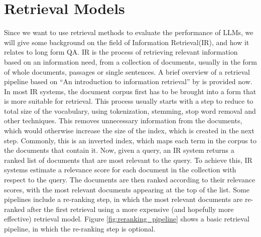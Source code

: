 \section{Retrieval Models}\label{sec:retrieval-models}
Since we want to use retrieval methods to evaluate the performance of LLMs, we will give some background on the field of Information Retrieval(IR), and how it relates to long form QA.
IR is the process of retrieving relevant information based on an information need, from a collection of documents, usually in the form of whole documents, passages or single sentences.
A brief overview of a retrieval pipeline based on ``An introduction to information retrieval'' by \cite{manning:2009:An} is provided now.
\\
In most IR systems, the document corpus first has to be brought into a form that is more suitable for retrieval.
This process usually starts with a step to reduce to total size of the vocabulary, using tokenization, stemming, stop word removal and other techniques.
This removes unnecessary information from the documents, which would otherwise increase the size of the index, which is created in the next step.
Commonly, this is an inverted index, which maps each term in the corpus to the documents that contain it.
Now, given a query, an IR system returns a ranked list of documents that are most relevant to the query.
To achieve this, IR systems estimate a relevance score for each document in the collection with respect to the query.
The documents are then ranked according to their relevance scores, with the most relevant documents appearing at the top of the list.
Some pipelines include a re-ranking step, in which the most relevant documents are re-ranked after the first retrieval using a more expensive (and hopefully more effective) retrieval model.
Figure \ref{fig:reranking_pipeline} shows a basic retrieval pipeline, in which the re-ranking step is optional.
